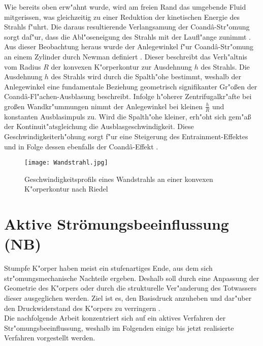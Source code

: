 Wie bereits oben erw"ahnt wurde, wird am freien Rand das umgebende Fluid mitgerissen, was gleichzeitig zu einer Reduktion der kinetischen Energie des Strahls f"uhrt. Die daraus resultierende Verlangsamung der Coand\^{a}-Str"omung sorgt daf"ur, dass die Abl"oseneigung des Strahls mit der Laufl"ange zunimmt \cite{Fischer.2011}. Aus dieser Beobachtung heraus wurde der Anlegewinkel f"ur Coand\^{a}-Str"omung an einem Zylinder durch Newman definiert \cite{Newman.1961}. Dieser beschreibt das Verh"altnis vom Radius $R$ der konvexen K"orperkontur zur Ausdehnung $h$ des Strahls. Die Ausdehnung $h$ des Strahls wird durch die Spalth"ohe bestimmt, weshalb der Anlegewinkel eine fundamentale Beziehung geometrisch signifikanter Gr"o\ss{}en der Coand\^{a}-Fl"achen-Ausblasung beschreibt. Infolge h"oherer Zentrifugalkr"afte bei gro\ss{}en Wandkr"ummungen nimmt der Anlegewinkel bei kleinen $\frac{h}{R}$ und konstanten Ausblasimpuls zu. Wird die Spalth"ohe kleiner, erh"oht sich gem"a\ss{} der Kontinuit"atsgleichung die Ausblasgeschwindigkeit. Diese Geschwindigkeiterh"ohung sorgt f"ur eine Steigerung des Entrainment-Effektes und in Folge dessen ebenfalls der Coand\^{a}-Effekt \cite{Fischer.2011}.


\begin{figure}[h]
	\centering
	\texttt{[image: Wandstrahl.jpg]}
	\caption{Geschwindigkeitsprofils eines Wandstrahls an einer konvexen K"orperkontur nach Riedel \cite{Riedel.1973}}
	\label{fig:Wandstrahl}
\end{figure}







\newpage
\section{Aktive Str\"omungsbeeinflussung (NB)}

Stumpfe K"orper haben meist ein stufenartiges Ende, aus dem sich str"omungsmechanische Nachteile ergeben. Deshalb soll durch eine Anpassung der Geometrie des K"orpers oder durch die strukturelle Ver"anderung des Totwassers dieser ausgeglichen werden. Ziel ist es, den Basisdruck anzuheben und dar"uber den Druckwiderstand des K"orpers zu verringern \cite{Hucho.2011}.\\
Die nachfolgende Arbeit konzentriert sich auf ein aktives Verfahren der Str"omungsbeeinflussung, weshalb im Folgenden einige bis jetzt realisierte Verfahren vorgestellt werden.\\

